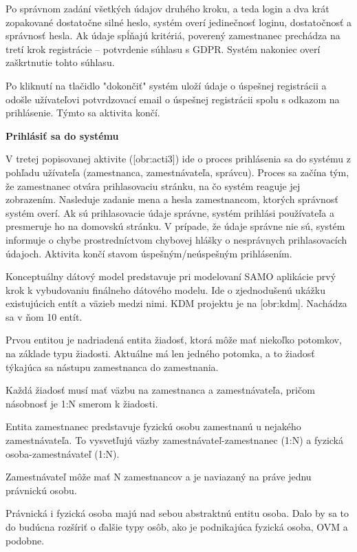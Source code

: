 Po správnom zadání všetkých údajov druhého kroku, a teda login a dva krát zopakované dostatočne silné heslo, systém overí jedinečnosť loginu, dostatočnosť a správnosť hesla. Ak údaje spĺňajú kritériá, poverený zamestnanec prechádza na tretí krok registrácie -- potvrdenie súhlasu s GDPR. Systém nakoniec overí zaškrtnutie tohto súhlasu.

Po kliknutí na tlačidlo "dokončiť" systém uloží údaje o úspešnej registrácii a odošle užívateľovi potvrdzovací email o úspešnej registrácii spolu s odkazom na prihlásenie. Týmto sa aktivita končí.

\blank
\start \bf Prihlásiť sa do systému\stop

V tretej popisovanej aktivite ([obr:acti3]) ide o proces prihlásenia sa do systému z pohľadu užívateľa (zamestnanca, zamestnávateľa, správcu). Proces sa začína tým, že zamestnanec otvára prihlasovaciu stránku, na čo systém reaguje jej zobrazením. Nasleduje zadanie mena a hesla zamestnancom, ktorých správnosť systém overí. Ak sú prihlasovacie údaje správne, systém prihlási používateľa a presmeruje ho na domovskú stránku. V prípade, že údaje správne nie sú, systém informuje o chybe prostredníctvom chybovej hlášky o nesprávnych prihlasovacích údajoch. Aktivita končí stavom úspešným/neúspešným prihlásením.

Konceptuálny dátový model predstavuje pri modelovaní SAMO aplikácie prvý krok k vybudovaniu finálneho dátového modelu. Ide o zjednodušenú ukážku existujúcich entít a väzieb medzi nimi. KDM projektu je na [obr:kdm]. Nachádza sa v ňom 10 entít.

Prvou entitou je nadriadená entita žiadosť, ktorá môže mať niekoľko potomkov, na základe typu žiadosti. Aktuálne má len jedného potomka, a to žiadosť týkajúca sa nástupu zamestnanca do zamestnania. 

Každá žiadosť musí mať väzbu na zamestnanca a zamestnávateľa, pričom násobnosť je 1:N smerom k žiadosti.

Entita zamestnanec predstavuje fyzickú osobu zamestnanú u nejakého zamestnávateľa. To vysvetľujú väzby zamestnávateľ-zamestnanec (1:N) a fyzická osoba-zamestnávateľ (1:N). 

Zamestnávateľ môže mať N zamestnancov a je naviazaný na práve jednu právnickú osobu. 

Právnická i fyzická osoba majú nad sebou abstraktnú entitu osoba. Dalo by sa to do budúcna rozšíriť o ďalšie typy osôb, ako je podnikajúca fyzická osoba, OVM a podobne. 

